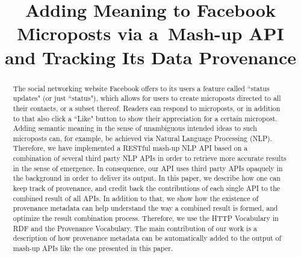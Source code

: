 \documentclass[conference]{IEEEtran}
\begin{document}
%
\title{Adding Meaning to Facebook Microposts via a~Mash-up API and Tracking Its Data Provenance}

\author{
\and
{}
\and
{}
}

\maketitle

\begin{abstract}
The social networking website Facebook offers to its users a feature called ``status updates" (or just ``status"), which allows for users to create microposts directed to all their contacts, or a subset thereof. Readers can respond to microposts, or in addition to that also click a ``Like" button to show their appreciation for a certain micropost. Adding semantic meaning in the sense of unambiguous intended ideas to such microposts can, for example, be achieved via Natural Language Processing (NLP). Therefore, we have implemented a RESTful mash-up NLP API based on a combination of several third party NLP APIs in order to retrieve more accurate results in the sense of emergence. In consequence, our API uses third party APIs opaquely in the background in order to deliver its output. In this paper, we describe how one can keep track of provenance, and credit back the contributions of each single API to the combined result of all APIs. In addition to that, we show how the existence of provenance metadata can help understand the way a combined result is formed, and optimize the result combination process. Therefore, we use the HTTP Vocabulary in RDF and the Provenance Vocabulary. The main contribution of our work is a description of how provenance metadata can be automatically added to the output of mash-up APIs like the one presented in this paper.
\end{abstract}
\end{document}
